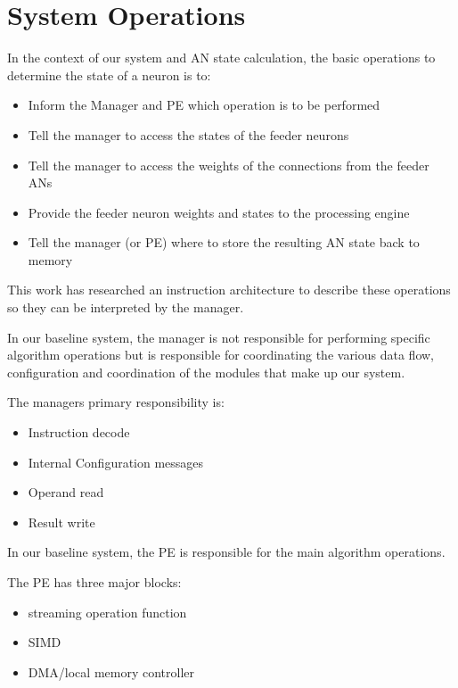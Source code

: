 \documentclass[journal]{IEEEtran}
\begin{document}
\section{System Operations}
\label{sec:System Operations}
In the context of our system and AN state calculation, the basic operations to determine the state of a neuron is to:

\begin{itemize}
    \item Inform the Manager and PE which operation is to be performed
    \item Tell the manager to access the states of the feeder neurons
    \item Tell the manager to access the weights of the connections from the feeder ANs
    \item Provide the feeder neuron weights and states to the processing engine
    \item Tell the manager (or PE) where to store the resulting AN state back to memory
\end{itemize}

This work has researched an instruction architecture to describe these operations so they can be interpreted by the manager. 

In our baseline system, the manager is not responsible for performing specific algorithm operations but is responsible for coordinating the various data flow, configuration and coordination of the modules that make up our system.

The managers primary responsibility is:

\begin{itemize}
    \item Instruction decode
    \item Internal Configuration messages
    \item Operand read
    \item Result write
\end{itemize}

In our baseline system, the PE is responsible for the main algorithm operations.

The PE has three major blocks:

\begin{itemize}
    \item streaming operation function
    \item SIMD
    \item DMA/local memory controller
\end{itemize}
\end{document}
